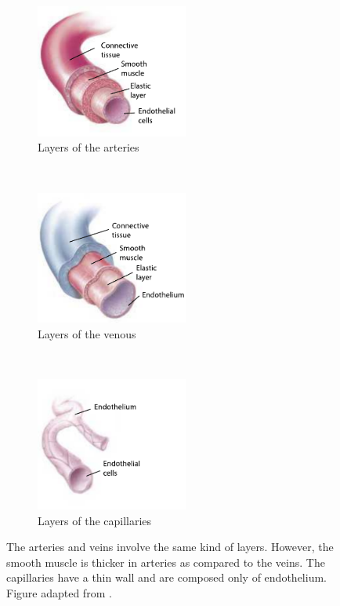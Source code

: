 \begin{figure}[!htbp]
	\centering
	\begin{subfigure}[t]{0.33\textwidth}
		\centering
		\includegraphics[width=5cm]{figure1a}
		\caption{Layers of the arteries}
		\label{fig:arteries composition}
	\end{subfigure}%
	~ 
	\begin{subfigure}[t]{0.33\textwidth}
		\centering
		\includegraphics[width=5cm]{figure1c}
		\caption{Layers of the venous}
		\label{fig:veins composition}
	\end{subfigure}
	~ 
	\begin{subfigure}[t]{0.33\textwidth}
		\centering
		\includegraphics[width=5cm, trim={0 0 2cm 0},clip]{figure1b}
		\caption{Layers of the capillaries}
		\label{fig:capillaries composition}
	\end{subfigure}
	\caption[Layers of the blood vessels]{The arteries and veins involve the same kind of layers. However, the smooth muscle is thicker in arteries as compared to the veins. The capillaries have a thin wall and are composed only of endothelium. Figure adapted from \cite{johnson2001biology}.}
	\label{fig:vessels composition}
\end{figure}

